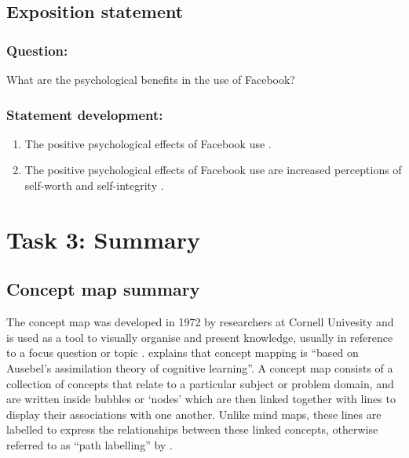 \documentclass[12pt,a4paper]{report}
\begin{document}
\subsection*{\textsf{Exposition statement}}

\subsubsection*{\textsf{Question:}}

What are the psychological benefits in the use of Facebook?

\subsubsection*{\textsf{Statement development:}}
\begin{enumerate}
\item The positive psychological effects of Facebook use \citep{Toma2013}.
\item The positive psychological effects of Facebook use are increased perceptions of self-worth and self-integrity \citep{Toma2013}.
\end{enumerate}

\newpage
\section*{\textsf{Task 3: Summary}}
\subsection*{\textsf{Concept map summary}}

The concept map was developed in 1972 by researchers at Cornell Univesity and is used as a tool to visually organise and present knowledge, usually in reference to a focus question or topic \citep{Novak2006, Hilbert2009}. \citet[pp. 267]{Hilbert2009} explains that concept mapping is ``based on Ausebel's assimilation theory of cognitive learning''. A concept map consists of a collection of concepts that relate to a particular subject or problem domain, and are written inside bubbles or `nodes' which are then linked together with lines to display their associations with one another. Unlike mind maps, these lines are labelled to express the relationships between these linked concepts, otherwise referred to as ``path labelling'' by \citet[pp. 790]{Rodriguez-Priego2013}.\\
\end{document}
